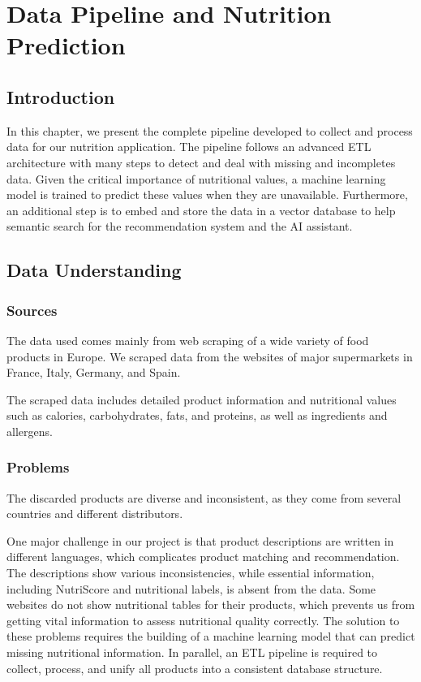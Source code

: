 \chapter{Data Pipeline and Nutrition Prediction }
\section*{Introduction}

In this chapter, we present the complete pipeline developed to collect and process data for our nutrition application. The pipeline follows an advanced ETL  architecture with many steps to detect and deal with missing and incompletes data. Given the critical importance of nutritional values, a machine learning model is trained to predict these values when they are unavailable. Furthermore, an additional step is to embed and store the data in a vector database to help semantic search for the recommendation system and the AI assistant.

\section{Data Understanding}
\subsection{Sources}
The data used comes mainly from web scraping of a wide variety of food products in Europe. We scraped data from the websites of major supermarkets in France, Italy, Germany, and Spain. 
\par The scraped data includes detailed product information and nutritional values such as calories, carbohydrates, fats, and proteins, as well as ingredients and allergens. 

\subsection{Problems} 
The discarded products are diverse and inconsistent, as they come from several countries and different distributors.


One major challenge in our project is that product descriptions are written in different languages, which complicates product matching and recommendation. The descriptions show various inconsistencies, while essential information, including NutriScore and nutritional labels, is absent from the data. Some websites do not show nutritional tables for their products, which prevents us from getting vital information to assess nutritional quality correctly. The solution to these problems requires the building of a machine learning model that can predict missing nutritional information. In parallel, an ETL pipeline is required to collect, process, and unify all products into a consistent database structure.

